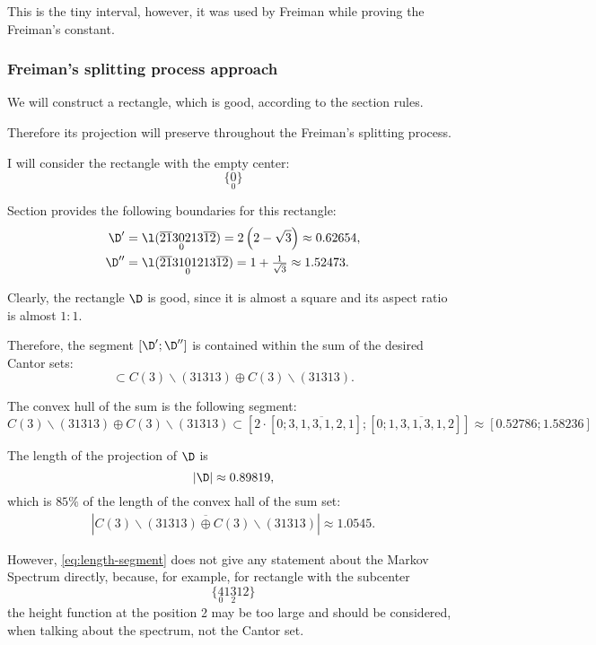This is the tiny interval, however, it was used by Freiman
while proving the Freiman's constant.


\subsubsection{Freiman's splitting process approach}

We will construct a rectangle,
which is good, according to the section  rules.

Therefore its projection will preserve throughout the Freiman's splitting process.

I will consider the rectangle with the empty center:
\begin{equation*}
	\{\underset{0}{0}\}
\end{equation*}

Section  provides the following boundaries for this rectangle:
\begin{align*}
	\D' & = \l(\overline{21}3\underset{0}{0}213\overline{12}) = 2\left(2 - \sqrt{3}\right) \approx 0.62654,\\
	\D'' & = \l(\overline{21}31\underset{0}{0}1213\overline{12}) = 1 + \tfrac{1}{\sqrt{3}} \approx 1.52473.
\end{align*}

Clearly, the rectangle $\D$ is good, since it is almost a square and its aspect ratio is almost $1:1$.

Therefore, the segment $[\D'; \D'']$ is contained within the sum of the desired Cantor sets:
\begin{equation}
	[\D'; \D''] \subset C(3) \backslash (31313) \oplus C(3) \backslash (31313).
\end{equation}

The convex hull of the sum is the following segment:
\begin{equation*}
	C(3) \backslash (31313) \oplus C(3) \backslash (31313) \subset
	\left[ 2 \cdot \left[0; \overline{3, 1, 3, 1, 2, 1}\right]; \left[0; \overline{1, 3, 1, 3, 1, 2}\right] \right] \approx
	\left[0.52786; 1.58236\right]
\end{equation*}

The length of the projection of $\D$ is
\begin{equation}
	\label{eq:length-segment}
	\left|\D\right| \approx 0.89819,
\end{equation}
which is $85\%$ of the length of the convex hall of the sum set:
\begin{gather*}
	\left|\overline{C(3) \backslash (31313) \oplus C(3) \backslash (31313)}\right| \approx 1.0545.
\end{gather*}

However, \ref{eq:length-segment} does not give any statement about the Markov Spectrum directly,
because, for example, for rectangle with the subcenter
\begin{equation*}
	\{\underset{0}{4}1\underset{2}{3}12\}
\end{equation*}
the height function at the position 2 may be too large and should be considered,
when talking about the spectrum, not the Cantor set.
